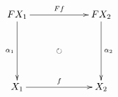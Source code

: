 \documentclass[12pt]{article}
\begin{document}
\pagestyle{empty}

\begin{align*}
  \vcenter{
    \xymatrix@=60pt{
      F X_1
      \ar@{->}[r]^{F f}
      \ar@{->}[d]_{\alpha_1}
      \ar@{{}{ }{}}[rd]|{\circlearrowright}
      &
      F X_2
      \ar@{->}[d]^{\alpha_2}
      \\
      X_1
      \ar@{->}[r]^{f}
      &
      X_2
    }
  }
\end{align*}
\end{document}
